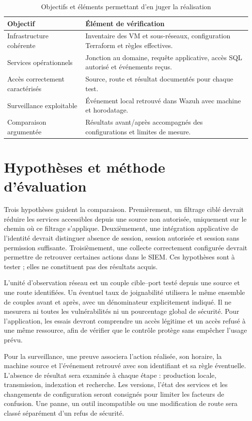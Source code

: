 \documentclass[a4paper,12pt]{report}
\begin{document}
\begin{table}[H]\centering\small
\caption{Objectifs et éléments permettant d'en juger la réalisation}
\begin{tabularx}{\textwidth}{p{4.1cm}Y}\toprule
\textbf{Objectif} & \textbf{Élément de vérification}\\\midrule
Infrastructure cohérente & Inventaire des VM et sous-réseaux, configuration Terraform et règles effectives.\\
Services opérationnels & Jonction au domaine, requête applicative, accès SQL autorisé et événements reçus.\\
Accès correctement caractérisés & Source, route et résultat documentés pour chaque test.\\
Surveillance exploitable & Événement local retrouvé dans Wazuh avec machine et horodatage.\\
Comparaison argumentée & Résultats avant/après accompagnés des configurations et limites de mesure.\\\bottomrule
\end{tabularx}\end{table}

\section{Hypothèses et méthode d'évaluation}
Trois hypothèses guident la comparaison. Premièrement, un filtrage ciblé devrait réduire les services accessibles depuis une source non autorisée, uniquement sur le chemin où ce filtrage s'applique. Deuxièmement, une intégration applicative de l'identité devrait distinguer absence de session, session autorisée et session sans permission suffisante. Troisièmement, une collecte correctement configurée devrait permettre de retrouver certaines actions dans le SIEM. Ces hypothèses sont à tester ; elles ne constituent pas des résultats acquis.

L'unité d'observation réseau est un couple cible--port testé depuis une source et une route identifiées. Un éventuel taux de joignabilité utilisera le même ensemble de couples avant et après, avec un dénominateur explicitement indiqué. Il ne mesurera ni toutes les vulnérabilités ni un pourcentage global de sécurité. Pour l'application, les essais devront comprendre un accès légitime et un accès refusé à une même ressource, afin de vérifier que le contrôle protège sans empêcher l'usage prévu.

Pour la surveillance, une preuve associera l'action réalisée, son horaire, la machine source et l'événement retrouvé avec son identifiant et sa règle éventuelle. L'absence de résultat sera examinée à chaque étape : production locale, transmission, indexation et recherche. Les versions, l'état des services et les changements de configuration seront consignés pour limiter les facteurs de confusion. Une panne, un outil incompatible ou une modification de route sera classé séparément d'un refus de sécurité.
\end{document}
